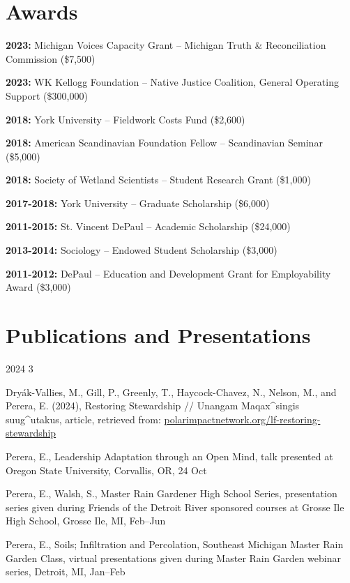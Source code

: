 \documentclass{../styles/cv}
\begin{document}
\section{Awards}
\resumesublistbegin
    \item \textbf{2023:} Michigan Voices Capacity Grant -- Michigan Truth \& Reconciliation Commission (\$7,500)
    \item \textbf{2023:} WK Kellogg Foundation -- Native Justice Coalition, General Operating Support (\$300,000)
    \item \textbf{2018:} York University -- Fieldwork Costs Fund (\$2,600)
    \item \textbf{2018:} American Scandinavian Foundation Fellow -- Scandinavian Seminar (\$5,000)
    \item \textbf{2018:} Society of Wetland Scientists -- Student Research Grant (\$1,000)
    \item \textbf{2017-2018:} York University -- Graduate Scholarship (\$6,000)
    \item \textbf{2011-2015:} St. Vincent DePaul -- Academic Scholarship (\$24,000)
    \item \textbf{2013-2014:} Sociology -- Endowed Student Scholarship (\$3,000)
    \item \textbf{2011-2012:} DePaul -- Education and Development Grant for Employability Award (\$3,000)
\resumesublistend

\section{Publications and Presentations}

\subsectiondate
    {2024}
    {3}
\resumesublistbegin
    \item Dryák-Vallies, M., Gill, P., Greenly, T., Haycock-Chavez, N., Nelson, M., and Perera, E. (2024), Restoring Stewardship // Unangam Maqax\^{}singis suug\^{}utakus, article, retrieved from: \href{https://www.polarimpactnetwork.org/lf-restoring-stewardship}{polarimpactnetwork.org/lf-restoring-stewardship}
    \item Perera, E., Leadership Adaptation through an Open Mind, talk presented at Oregon State University, Corvallis, OR, 24 Oct
    \item Perera, E., Walsh, S., Master Rain Gardener High School Series, presentation series given during Friends of the Detroit River sponsored courses at Grosse Ile High School, Grosse Ile, MI, Feb--Jun
    \item Perera, E., Soils; Infiltration and Percolation, Southeast Michigan Master Rain Garden Class, virtual presentations given during Master Rain Garden webinar series, Detroit, MI, Jan--Feb
\resumesublistend
\end{document}
